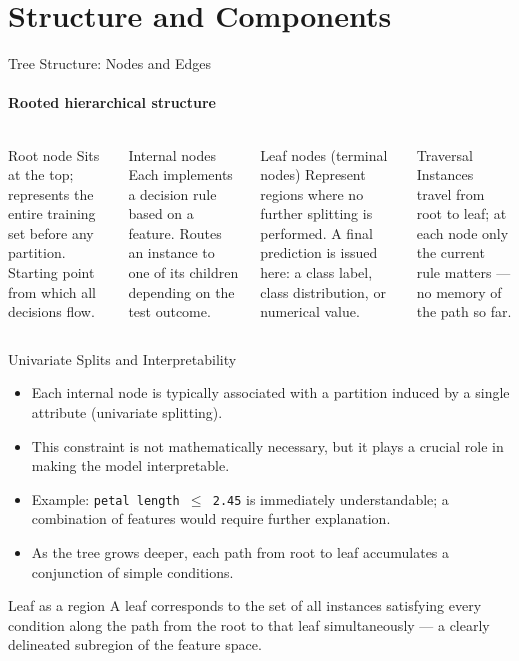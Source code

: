 \section{Structure and Components}

\begin{frame}{Tree Structure: Nodes and Edges}
  \framesubtitle{Rooted hierarchical structure}
  \begin{columns}[t]
      \begin{block}{Root node}
        Sits at the top; represents the \alert{entire training set} before any partition.
        Starting point from which all decisions flow.
      \end{block}
      \vspace{0.4em}
      \begin{block}{Internal nodes}
        Each implements a \alert{decision rule} based on a feature. Routes an instance to
        one of its children depending on the test outcome.
      \end{block}
      \begin{block}{Leaf nodes (terminal nodes)}
        Represent regions where \alert{no further splitting} is performed. A final
        prediction is issued here: a class label, class distribution, or numerical value.
      \end{block}
      \vspace{0.4em}
      \begin{alertblock}{Traversal}
        Instances travel from root to leaf; at each node only the \alert{current rule} matters —
        no memory of the path so far.
      \end{alertblock}
  \end{columns}
\end{frame}

\begin{frame}{Univariate Splits and Interpretability}
  \begin{itemize}
    \item Each internal node is typically associated with a partition induced by a
          \alert{single attribute} (univariate splitting).
    \item This constraint is not mathematically necessary, but it plays a crucial role in
          making the model \alert{interpretable}.
    \item Example: \texttt{petal length $\leq$ 2.45} is immediately understandable;
          a combination of features would require further explanation.
    \item As the tree grows deeper, each path from root to leaf accumulates a
          \alert{conjunction of simple conditions}.
  \end{itemize}
  \begin{block}{Leaf as a region}
    A leaf corresponds to the set of all instances satisfying \alert{every condition}
    along the path from the root to that leaf simultaneously — a clearly delineated
    subregion of the feature space.
  \end{block}
\end{frame}

